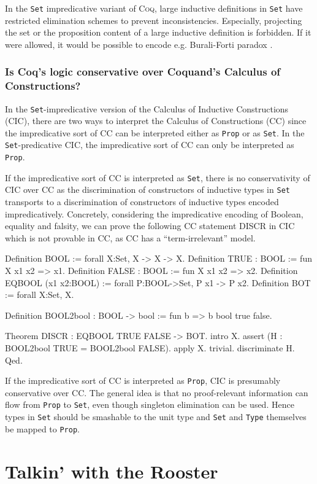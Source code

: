 \documentclass[a4paper,pdftex]{article}
\def\Question#1{\stepcounter{question}\subsubsection{#1}}
\def\Coq{\textsc{Coq}}
\def\Type{{\tt Type}}
\def\Prop{{\tt Prop}}
\def\Set{{\tt Set}}
\begin{document}
In the {\tt Set} impredicative variant of {\Coq}, large inductive
definitions in {\tt Set} have restricted elimination schemes to
prevent inconsistencies. Especially, projecting the set or the
proposition content of a large inductive definition is forbidden. If
it were allowed, it would be possible to encode e.g. Burali-Forti
paradox \cite{Gir70,Coq85}.


\Question{Is Coq's logic conservative over Coquand's Calculus of 
Constructions?}

In the {\Set}-impredicative version of the Calculus of Inductive
Constructions (CIC), there are two ways to interpret the Calculus of
Constructions (CC) since the impredicative sort of CC can be
interpreted either as {\Prop} or as {\Set}. In the {\Set}-predicative
CIC, the impredicative sort of CC can only be interpreted as {\Prop}.

If the impredicative sort of CC is interpreted as {\Set}, there is no
conservativity of CIC over CC as the discrimination of
constructors of inductive types in {\Set} transports to a
discrimination of constructors of inductive types encoded
impredicatively. Concretely, considering the impredicative encoding of
Boolean, equality and falsity, we can prove the following CC statement
DISCR in CIC which is not provable in CC, as CC has a
``term-irrelevant'' model.

\begin{coq_example*}
Definition BOOL := forall X:Set, X -> X -> X.
Definition TRUE : BOOL := fun X x1 x2 => x1.
Definition FALSE : BOOL := fun X x1 x2 => x2.
Definition EQBOOL (x1 x2:BOOL) := forall P:BOOL->Set, P x1 -> P x2.
Definition BOT := forall X:Set, X.

Definition BOOL2bool : BOOL -> bool := fun b => b bool true false.

Theorem DISCR : EQBOOL TRUE FALSE -> BOT.
intro X.
assert (H : BOOL2bool TRUE = BOOL2bool FALSE).
{ apply X. trivial. }
discriminate H.
Qed.
\end{coq_example*}

If the impredicative sort of CC is interpreted as {\Prop}, CIC is
presumably conservative over CC. The general idea is that no
proof-relevant information can flow from {\Prop} to {\Set}, even
though singleton elimination can be used. Hence types in {\Set} should
be smashable to the unit type and {\Set} and {\Type} themselves be
mapped to {\Prop}.

\section{Talkin' with the Rooster}
\end{document}
